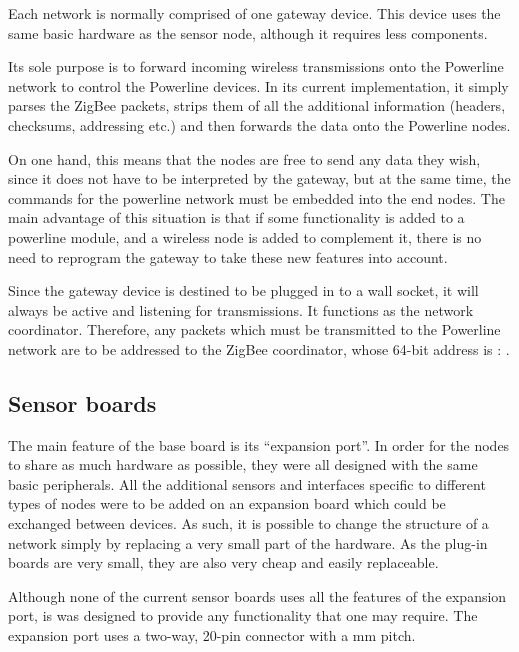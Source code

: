 Each network is normally comprised of one gateway device. This device uses the
same basic hardware as the sensor node, although it requires less components.

Its sole purpose is to forward incoming wireless transmissions onto the
Powerline network to control the Powerline devices. In its current
implementation, it simply parses the ZigBee packets, strips them of all the
additional information (headers, checksums, addressing etc.) and then forwards
the data onto the Powerline nodes.

On one hand, this means that the nodes are free to send any data they wish,
since it does not have to be interpreted by the gateway, but at the same time,
the commands for the powerline network must be embedded into the end nodes. The
main advantage of this situation is that if some functionality is added to a
powerline module, and a wireless node is added to complement it, there is no
need to reprogram the gateway to take these new features into account.

Since the gateway device is destined to be plugged in to a wall socket, it will
always be active and listening for transmissions. It functions as the network
coordinator. Therefore, any packets which must be transmitted to the Powerline
network are to be addressed to the ZigBee coordinator, whose 64-bit address is :
.

\subsection{Sensor boards}

The main feature of the base board is its ``expansion port''. In order for the
nodes to share as much hardware as possible, they were all designed with the
same basic peripherals. All the additional sensors and interfaces specific to
different types of nodes were to be added on an expansion board which could be
exchanged between devices. As such, it is possible to change the structure of a
network simply by replacing a very small part of the hardware. As the plug-in
boards are very small, they are also very cheap and easily replaceable.

Although none of the current sensor boards uses all the features of the
expansion port, is was designed to provide any functionality that one may
require. The expansion port uses a two-way, 20-pin connector with a \unit[2]{mm}
pitch.

